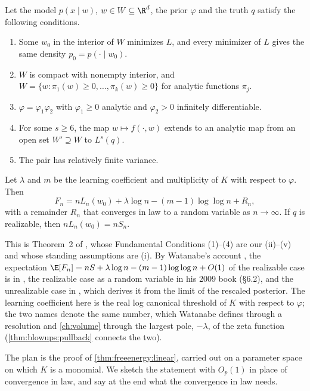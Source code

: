 \begin{refsection}
\begin{theorem}\label{thm:freeenergy:main}
Let the model $p(x\mid w)$, $w\in W\subseteq\R^d$, the prior $\varphi$ and the truth $q$ satisfy the following conditions.
\begin{enumerate}[label=(\roman*),nosep]
\item Some $w_0$ in the interior of $W$ minimizes $L$, and every minimizer of $L$ gives the same density $p_0=p(\cdot\mid w_0)$.
\item $W$ is compact with nonempty interior, and $W=\{w:\pi_1(w)\ge0,\dots,\pi_k(w)\ge0\}$ for analytic functions $\pi_j$.
\item $\varphi=\varphi_1\varphi_2$ with $\varphi_1\ge0$ analytic and $\varphi_2>0$ infinitely differentiable.
\item For some $s\ge6$, the map $w\mapsto f(\cdot,w)$ extends to an analytic map from an open set $W'\supseteq W$ to $L^s(q)$.
\item The pair has relatively finite variance.
\end{enumerate}
Let $\lambda$ and $m$ be the learning coefficient and multiplicity of $K$ with respect to $\varphi$. Then
\[
F_n=nL_n(w_0)+\lambda\log n-(m-1)\log\log n+R_n,
\]
with a remainder $R_n$ that converges in law to a random variable as $n\to\infty$. If $q$ is realizable, then $nL_n(w_0)=nS_n$.
\end{theorem}

This is Theorem~2 of \textcite{Watanabe2013}, whose Fundamental Conditions (1)--(4) are our (ii)--(v) and whose standing assumptions are (i). By Watanabe's account \parencite[p.~876]{Watanabe2013}, the expectation $\E[F_n]=nS+\lambda\log n-(m-1)\log\log n+O(1)$ of the realizable case is in \textcite{Watanabe2001a}, the realizable case as a random variable in his 2009 book (\S6.2), and the unrealizable case in \textcite{Watanabe2010d}, which derives it from the limit of the rescaled posterior. The learning coefficient here is the real log canonical threshold of $K$ with respect to $\varphi$; the two names denote the same number, which Watanabe defines through a resolution and \cref{ch:volume} through the largest pole, $-\lambda$, of the zeta function (\cref{thm:blowups:pullback} connects the two).

\begin{proofsketch}
The plan is the proof of \cref{thm:freeenergy:linear}, carried out on a parameter space on which $K$ is a monomial. We sketch the statement with $O_p(1)$ in place of convergence in law, and say at the end what the convergence in law needs.


\end{proofsketch}
\end{refsection}
